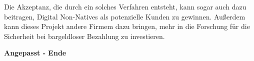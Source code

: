 Die Akzeptanz, die durch ein solches Verfahren entsteht, kann sogar auch dazu beitragen, Digital Non-Natives als potenzielle
Kunden zu gewinnen. Außerdem kann dieses Projekt andere Firmem dazu bringen, mehr in die Forschung für die Sicherheit bei
bargeldloser Bezahlung zu investieren.



\textbf{Angepasst - Ende}


